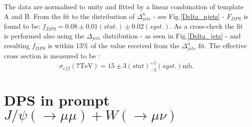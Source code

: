\documentclass{ws-rv9x6}
\begin{document}
The data are normalised to unity and fitted by a linear combination of template A and B. From the fit to the distribution
 of $\Delta^n_{jets}$ - see Fig.\ref{Delta_njets} - $F_{D\!P\!S}$ is found to be:
$ f_{D\!P\!S} = 0.08 \pm 0.01 (stat.) \pm 0.02 (syst.).$
As a cross-check the fit is performed also using the $\Delta_{jets}$ distribution - as seen in Fig.\ref{Delta_jets} - and resulting $f_{D\!P\!S}$ is within 13\% of the value received from the $\Delta_{jets}^n$ fit.
The effective cross section is measured to be :
\begin{equation}
\sigma_{e\!f\!f}(7 \textrm{TeV}) = 15 \pm 3(stat) ^{+5}_{-3} (syst.) \textrm{mb}.
\end{equation}
 
\section{DPS in prompt $J/\psi(\rightarrow \mu\mu) + W(\rightarrow \mu\nu)$ }
\end{document}
